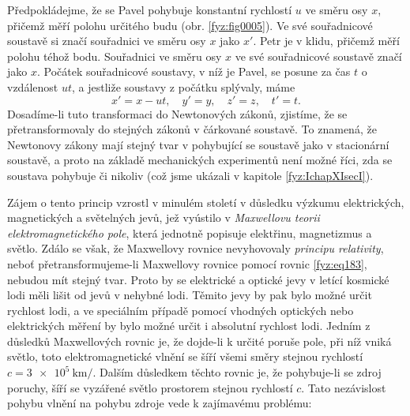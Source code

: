   
    Předpokládejme, že se Pavel pohybuje konstantní rychlostí \(u\) ve směru osy \(x\), přičemž měří
    polohu určitého budu (obr. \ref{fyz:fig0005}). Ve své souřadnicové soustavě si značí souřadnici
    ve směru osy \(x\) jako \(x'\). Petr je v klidu, přičemž měří polohu téhož bodu. Souřadnici ve
    směru osy \(x\) ve své souřadnicové soustavě značí jako \(x\). Počátek souřadnicové soustavy, v
    níž je Pavel, se posune za čas \(t\) o vzdálenost \(ut\), a jestliže soustavy z počátku
    splývaly, máme
    \begin{equation}\label{fyz:eq183}
      x' = x - ut, \quad y' = y, \quad z' = z, \quad t' = t. 
    \end{equation}
    Dosadíme-li tuto transformaci do Newtonových zákonů, zjistíme, že se přetransformovaly do
    stejných zákonů v čárkované soustavě. To znamená, že Newtonovy zákony mají stejný tvar v
    pohybující se soustavě jako v stacionární soustavě, a proto na základě mechanických experimentů
    není možné říci, zda se soustava pohybuje či nikoliv (což jsme ukázali v kapitole
    \ref{fyz:IchapXIsecI}). 
    
    Zájem o tento princip vzrostl v minulém století v důsledku výzkumu elektrických, magnetických a
    světelných jevů, jež vyústilo v \emph{Maxwellovu teorii elektromagnetického pole}, která
    jednotně popisuje elektřinu, magnetizmus a světlo. Zdálo se však, že Maxwellovy rovnice
    nevyhovovaly \emph{principu relativity}, neboť přetransformujeme-li Maxwellovy rovnice pomocí
    rovnic \ref{fyz:eq183}, nebudou mít stejný tvar. Proto by se elektrické a optické jevy v letící
    kosmické lodi měli lišit od jevů v nehybné lodi. Těmito jevy by pak bylo možné určit rychlost
    lodi, a ve speciálním případě pomocí vhodných optických nebo elektrických měření by bylo možné
    určit i absolutní rychlost lodi. Jedním z důsledků Maxwellových rovnic je, že dojde-li k určité
    poruše pole, při níž vniká světlo, toto elektromagnetické vlnění se šíří všemi směry stejnou
    rychlostí \(c = \SI{3e5}{\km\per}\). Dalším důsledkem těchto rovnic je, že pohybuje-li se zdroj
    poruchy, šíří se vyzářené světlo prostorem stejnou rychlostí \(c\). Tato nezávislost pohybu
    vlnění na pohybu zdroje vede k zajímavému problému:
    
